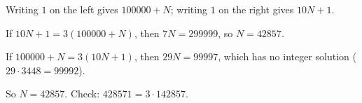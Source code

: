 Writing $1$ on the left gives $100000+N$; writing $1$ on the right gives $10N+1$.

If $10N+1=3(100000+N)$, then $7N=299999$, so $N=42857$.

If $100000+N=3(10N+1)$, then $29N=99997$, which has no integer solution ($29\cdot3448=99992$).

So $N=\boxed{42857}$. Check: $428571=3\cdot142857$.
